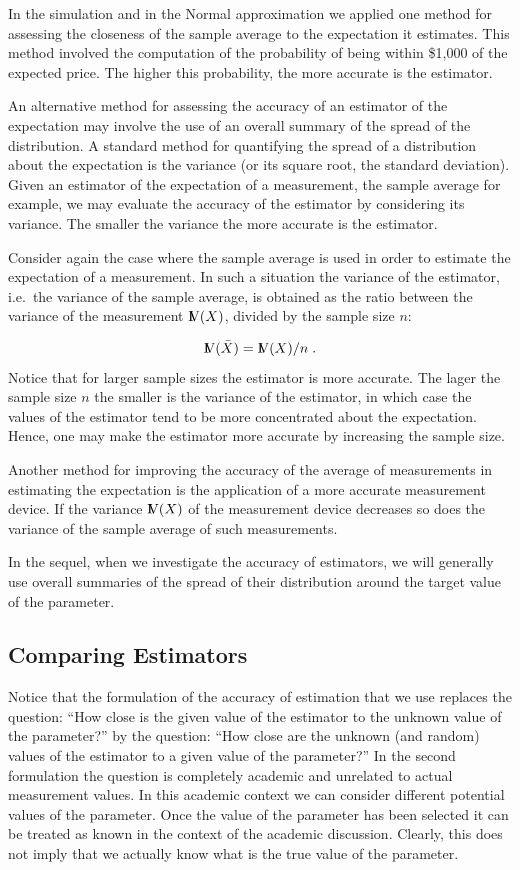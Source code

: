 \documentclass[]{krantz}
\newcommand{\Var}{{\rm I\kern-.3em V}}
\theoremstyle{definition}
\theoremstyle{definition}
\theoremstyle{definition}
\theoremstyle{remark}
\begin{document}
In the simulation and in the Normal approximation we applied one method
for assessing the closeness of the sample average to the expectation it
estimates. This method involved the computation of the probability of
being within \$1,000 of the expected price. The higher this probability,
the more accurate is the estimator.

An alternative method for assessing the accuracy of an estimator of the
expectation may involve the use of an overall summary of the spread of
the distribution. A standard method for quantifying the spread of a
distribution about the expectation is the variance (or its square root,
the standard deviation). Given an estimator of the expectation of a
measurement, the sample average for example, we may evaluate the
accuracy of the estimator by considering its variance. The smaller the
variance the more accurate is the estimator.

Consider again the case where the sample average is used in order to
estimate the expectation of a measurement. In such a situation the
variance of the estimator, i.e.~the variance of the sample average, is
obtained as the ratio between the variance of the measurement
\(\Var(X)\), divided by the sample size \(n\):

\[\Var(\bar X) = \Var(X)/n\;.\] Notice that for larger sample sizes the
estimator is more accurate. The lager the sample size \(n\) the smaller
is the variance of the estimator, in which case the values of the
estimator tend to be more concentrated about the expectation. Hence, one
may make the estimator more accurate by increasing the sample size.

Another method for improving the accuracy of the average of measurements
in estimating the expectation is the application of a more accurate
measurement device. If the variance \(\Var(X)\) of the measurement
device decreases so does the variance of the sample average of such
measurements.

In the sequel, when we investigate the accuracy of estimators, we will
generally use overall summaries of the spread of their distribution
around the target value of the parameter.

\subsection{Comparing Estimators}\label{ComparingEstimators}

Notice that the formulation of the accuracy of estimation that we use
replaces the question: ``How close is the given value of the estimator
to the unknown value of the parameter?'' by the question: ``How close
are the unknown (and random) values of the estimator to a given value of
the parameter?'' In the second formulation the question is completely
academic and unrelated to actual measurement values. In this academic
context we can consider different potential values of the parameter.
Once the value of the parameter has been selected it can be treated as
known in the context of the academic discussion. Clearly, this does not
imply that we actually know what is the true value of the parameter.
\end{document}
